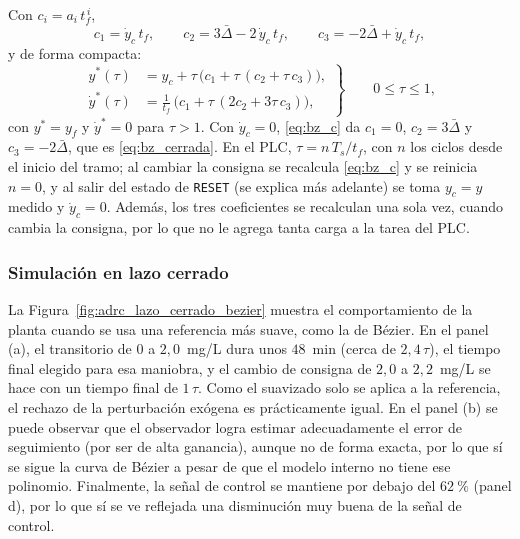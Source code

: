 Con $c_i = a_i\,t_f^{\,i}$,
\begin{equation}
c_1 = \dot{y}_c\,t_f , \qquad
c_2 = 3\bar{\Delta} - 2\,\dot{y}_c\,t_f , \qquad
c_3 = -2\bar{\Delta} + \dot{y}_c\,t_f ,
\label{eq:bz_c}
\end{equation}
y de forma compacta:
\begin{equation}
\left.
\begin{aligned}
y^*(\tau) &= y_c + \tau\,\bigl(c_1 + \tau\,(c_2 + \tau\,c_3)\bigr) , \\
\dot{y}^*(\tau) &= \frac{1}{t_f}\,\bigl(c_1 + \tau\,(2c_2 + 3\tau\,c_3)\bigr) ,
\end{aligned}
\right\}
\qquad 0 \le \tau \le 1 ,
\label{eq:bz_horner}
\end{equation}
con $y^* = y_f$ y $\dot{y}^* = 0$ para $\tau > 1$. Con $\dot{y}_c = 0$,
\eqref{eq:bz_c} da $c_1 = 0$, $c_2 = 3\bar{\Delta}$ y $c_3 = -2\bar{\Delta}$, que es
\eqref{eq:bz_cerrada}. En el PLC, $\tau = n\,T_s/t_f$, con $n$ los ciclos desde
el inicio del tramo; al cambiar la consigna se recalcula \eqref{eq:bz_c} y se
reinicia $n = 0$, y al salir del estado de \texttt{RESET} (se explica más adelante) se toma $y_c = y$ medido y
$\dot{y}_c = 0$. Además, los tres coeficientes se recalculan una
sola vez, cuando cambia la consigna, por lo que no le agrega tanta carga a la tarea del PLC.

\subsubsection{Simulación en lazo cerrado}
\label{subsec:bz_simulacion}
La Figura~\ref{fig:adrc_lazo_cerrado_bezier} muestra el comportamiento de la planta cuando
se usa una referencia más suave, como la de Bézier. En el panel (a), el transitorio de $0$ a
$2{,}0$~mg/L dura unos $48$~min (cerca de $2{,}4\,\tau$), el tiempo final elegido para esa
maniobra, y el cambio de consigna de $2{,}0$ a $2{,}2$~mg/L se hace con un tiempo final de
$1\,\tau$. Como el suavizado solo se aplica a la referencia, el rechazo de la perturbación
exógena es prácticamente igual. En el panel (b) se puede observar que el observador logra
estimar adecuadamente el error de seguimiento (por ser de alta ganancia), aunque no de forma
exacta, por lo que sí se
sigue la curva de Bézier a pesar de que el modelo interno no tiene ese polinomio. Finalmente,
la señal de control se mantiene por debajo del $62~\%$ (panel d), por lo que sí se ve
reflejada una disminución muy buena de la señal de control.


